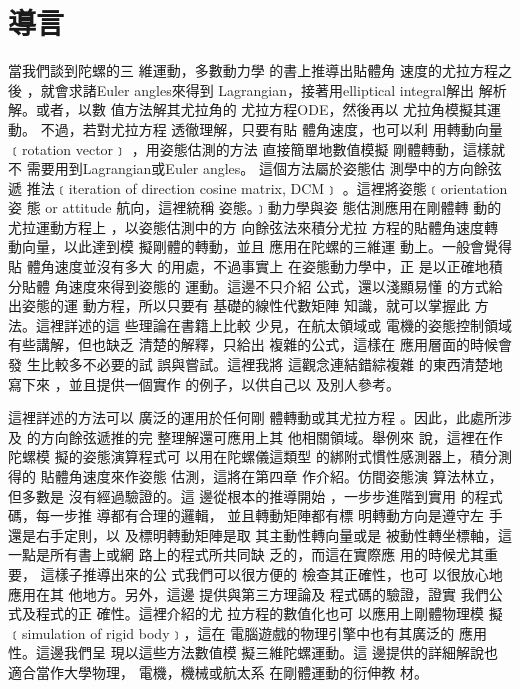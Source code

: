 \documentclass[12pt,twoside]{article}
\begin{document}

%

\part{導言\protect\bigskip}

當我們談到陀螺的三%
維運動，多數動力學%
的書上推導出貼體角%
速度的尤拉方程之後%
，就會求諸Euler angles來得到%
Lagrangian，接著用elliptical integral解出%
解析解。或者，以數%
值方法解其尤拉角的%
尤拉方程ODE，然後再以%
尤拉角模擬其運動。%
不過，若對尤拉方程%
透徹理解，只要有貼%
體角速度，也可以利%
用轉動向量﹝rotation vector﹞%
，用姿態估測的方法%
直接簡單地數值模擬%
剛體轉動，這樣就不%
需要用到Lagrangian或Euler angles。%
這個方法屬於姿態估%
測學中的方向餘弦遞%
推法﹝iteration of direction cosine matrix, DCM﹞%
。這裡將姿態﹝orientation 姿%
態 or attitude 航向，這裡統稱%
姿態。﹞動力學與姿%
態估測應用在剛體轉%
動的尤拉運動方程上%
，以姿態估測中的方%
向餘弦法來積分尤拉%
方程的貼體角速度轉%
動向量，以此達到模%
擬剛體的轉動，並且%
應用在陀螺的三維運%
動上。一般會覺得貼%
體角速度並沒有多大%
的用處，不過事實上%
在姿態動力學中，正%
是以正確地積分貼體%
角速度來得到姿態的%
運動。這邊不只介紹%
公式，還以淺顯易懂%
的方式給出姿態的運%
動方程，所以只要有%
基礎的線性代數矩陣%
知識，就可以掌握此%
方法。這裡詳述的這%
些理論在書籍上比較%
少見，在航太領域或%
電機的姿態控制領域%
有些講解，但也缺乏%
清楚的解釋，只給出%
複雜的公式，這樣在%
應用層面的時候會發%
生比較多不必要的試%
誤與嘗試。這裡我將%
這觀念連結錯綜複雜%
的東西清楚地寫下來%
，並且提供一個實作%
的例子，以供自己以%
及別人參考。

\bigskip

這裡詳述的方法可以%
廣泛的運用於任何剛%
體轉動或其尤拉方程%
。因此，此處所涉及%
的方向餘弦遞推的完%
整理解還可應用上其%
他相關領域。舉例來%
說，這裡在作陀螺模%
擬的姿態演算程式可%
以用在陀螺儀這類型%
的綁附式慣性感測器\cite%
[Ch 3.6.4]{titterton}上，積分測得的%
貼體角速度來作姿態%
估測，這將在第四章%
作介紹。仿間姿態演%
算法林立，但多數是%
沒有經過驗證的。這%
邊從根本的推導開始%
，一步步進階到實用%
的程式碼，每一步推%
導都有合理的邏輯，%
並且轉動矩陣都有標%
明轉動方向是遵守左%
手還是右手定則，以%
及標明轉動矩陣是取%
其主動性轉向量或是%
被動性轉坐標軸，這%
一點是所有書上或網%
路上的程式所共同缺%
乏的，而這在實際應%
用的時候尤其重要，%
這樣子推導出來的公%
式我們可以很方便的%
檢查其正確性，也可%
以很放心地應用在其%
他地方。另外，這邊%
提供與第三方理論及%
程式碼的驗證，證實%
我們公式及程式的正%
確性。這裡介紹的尤%
拉方程的數值化也可%
以應用上剛體物理模%
擬﹝simulation of rigid body﹞，這在%
電腦遊戲的物理引擎\cite%
[Ch 2.3]{pixarnote}中也有其廣泛的%
應用性。這邊我們呈%
現以這些方法數值模%
擬三維陀螺運動。這%
邊提供的詳細解說也%
適合當作大學物理，%
電機，機械或航太系%
在剛體運動的衍伸教%
材。
\end{document}
